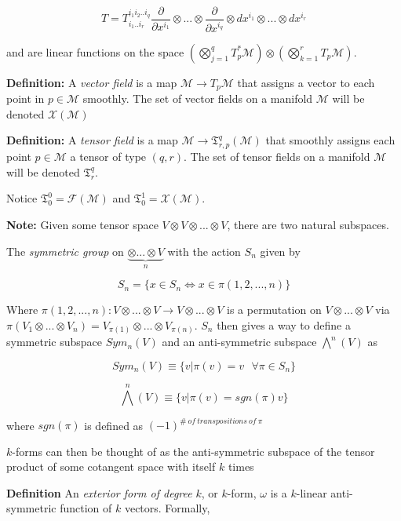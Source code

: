 \documentclass{article}\usepackage[]{graphicx}\usepackage[]{color}
\newcommand{\M}{\mathcal{M}}
\begin{document}
$$
T=T^{i_1i_2..i_q}_{i_1..i_r}\frac{\partial}{\partial x^{i_1}}\otimes...\otimes\frac{\partial}{\partial x^{i_q}}\otimes dx^{i_1} \otimes ... \otimes dx^{i_r}
$$

and are linear functions on the space $\left(\bigotimes_{j=1}^{q}T^*_p\M \right) \otimes\left(  \bigotimes_{k=1}^{r}T_p\M\right)$.

\textbf{Definition:} A \textit{vector field} is a map $\M\rightarrow T_p\M$ that assigns a vector to each point in $p\in\M$ smoothly. The set of vector fields on a manifold $\M$ will be denoted $\mathcal{X}(\M)$

\textbf{Definition:} A \textit{tensor field} is a map $\M \rightarrow \mathfrak{T}^q_{r,p}(\M )$ that smoothly assigns each point $p\in\M$ a tensor of type $(q,r)$. The set of tensor fields on a manifold $\M$ will be denoted $\mathfrak{T}^q_{r}$.

Notice $\mathfrak{T}^0_0=\mathcal{F}(\M)$ and $\mathfrak{T}^1_0=\mathcal{X}(\M)$.
  

\textbf{Note:} Given some tensor space $V\otimes V\otimes...\otimes V$, there are two natural subspaces.

The \textit{symmetric group} on $\underbrace{\otimes ... \otimes V}_n$ with the action $S_n$ given by 

$$
S_n=\lbrace x\in S_n \iff x\in \pi (1,2,...,n)\rbrace
$$

Where $\pi (1,2,...,n):V\otimes ... \otimes V \rightarrow V\otimes ... \otimes V$ is a permutation on $V\otimes ... \otimes V$ via $\pi (V_1\otimes ... \otimes V_n )=V_{\pi (1)}\otimes ... \otimes V_{\pi (n)}$. $S_n$ then gives a way to define a symmetric subspace $Sym_n(V)$ and an anti-symmetric subspace $\bigwedge^n(V)$ as

$$
Sym_n (V) \equiv \lbrace v \vert \pi (v)=v \ \ \ \forall \pi \in S_n\rbrace
$$

$$
\bigwedge^n(V)\equiv \lbrace v\vert \pi (v)= sgn(\pi ) v\rbrace
$$
 
 \begin{center}
 where $sgn(\pi)$ is defined as $(-1)^{\# \ of \ transpositions \ of \ \pi}$  
\end{center}  
 
$k$-forms can then be thought of as the anti-symmetric subspace of the tensor product of some cotangent space with itself $k$ times
 
 
 \textbf{Definition} An \textit{exterior form of degree} $k$, or $k$-form, $\omega$  is a $k$-linear anti-symmetric function of $k$ vectors. Formally,
 
\end{document}
